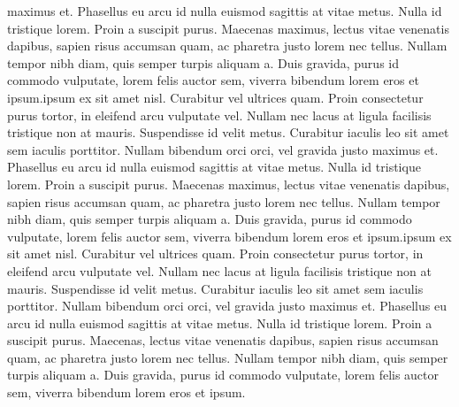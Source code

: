 \documentclass{article}
\begin{document}
maximus et. Phasellus eu arcu id nulla euismod sagittis at vitae metus. Nulla id tristique lorem. Proin a suscipit purus. Maecenas maximus, lectus vitae venenatis dapibus, sapien risus accumsan quam, ac pharetra justo lorem nec tellus. Nullam tempor nibh diam, quis semper turpis aliquam a. Duis gravida, purus id commodo vulputate, lorem felis auctor sem, viverra bibendum lorem eros et ipsum.ipsum ex sit amet nisl. Curabitur vel ultrices quam. Proin consectetur purus tortor, in eleifend arcu vulputate vel. Nullam nec lacus at ligula facilisis tristique non at mauris. Suspendisse id velit metus. Curabitur iaculis leo sit amet sem iaculis porttitor. Nullam bibendum orci orci, vel gravida justo maximus et. Phasellus eu arcu id nulla euismod sagittis at vitae metus. Nulla id tristique lorem. Proin a suscipit purus. Maecenas maximus, lectus vitae venenatis dapibus, sapien risus accumsan quam, ac pharetra justo lorem nec tellus. Nullam tempor nibh diam, quis semper turpis aliquam a. Duis gravida, purus id commodo vulputate, lorem felis auctor sem, viverra bibendum lorem eros et ipsum.ipsum ex sit amet nisl. Curabitur vel ultrices quam. Proin consectetur purus tortor, in eleifend arcu vulputate vel. Nullam nec lacus at ligula facilisis tristique non at mauris. Suspendisse id velit metus. Curabitur iaculis leo sit amet sem iaculis porttitor. Nullam bibendum orci orci, vel gravida justo maximus et. Phasellus eu arcu id nulla euismod sagittis at vitae metus. Nulla id tristique lorem. Proin a suscipit purus. Maecenas, lectus vitae venenatis dapibus, sapien risus accumsan quam, ac pharetra justo lorem nec tellus. Nullam tempor nibh diam, quis semper turpis aliquam a. Duis gravida, purus id commodo vulputate, lorem felis auctor sem, viverra bibendum lorem eros et ipsum.

\endnumbering
\end{document}
